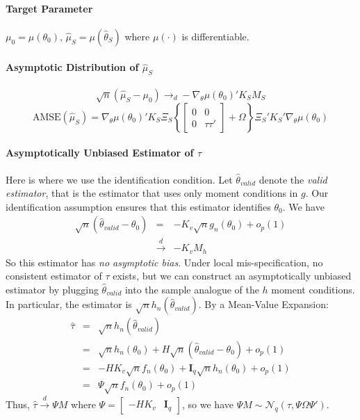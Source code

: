 \paragraph{Target Parameter} $\mu_0 = \mu(\theta_0)$, $\widehat{\mu}_S = \mu(\widehat{\theta}_S)$ where $\mu(\cdot)$ is differentiable.

\paragraph{Asymptotic Distribution of $\widehat{\mu}_S$} 
$$\sqrt{n}\left(\widehat{\mu}_S - \mu_0\right)\rightarrow_d-\nabla_\theta\mu(\theta_0)'K_S M_S$$
$$\mbox{AMSE}\left(\widehat{\mu}_S\right) = \nabla_\theta\mu(\theta_0)'K_S \Xi_S \left\{\left[\begin{array}{cc}0&0\\0&\tau\tau'\end{array}\right] + \Omega\right\}\Xi_S'K_S'\nabla_\theta\mu(\theta_0)$$

\paragraph{Asymptotically Unbiased Estimator of $\tau$} Here is where we use the identification condition. Let $\widehat{\theta}_{valid}$ denote the \emph{valid estimator}, that is the estimator that uses only moment conditions in $g$. Our identification assumption ensures that this estimator identifies $\theta_0$. We have
\begin{eqnarray*}
	\sqrt{n}\left(\widehat{\theta}_{valid} - \theta_0 \right) &=&  -K_v \sqrt{n}g_n(\theta_0) + o_p(1)\\
	&\overset{d}{\rightarrow}& -K_v M_h
\end{eqnarray*}
So this estimator has \emph{no asymptotic bias}. Under local mis-specification, no consistent estimator of $\tau$ exists, but we can construct an asymptotically unbiased estimator by plugging $\widehat{\theta}_{valid}$ into the sample analogue of the $h$ moment conditions. In particular, the estimator is $\sqrt{n} h_n\left(\widehat{\theta}_{valid}\right)$. By a Mean-Value Expansion:
\begin{eqnarray*}
	\widehat{\tau} &=& \sqrt{n} h_n\left(\widehat{\theta}_{valid}\right)\\
	& =& \sqrt{n}h_n(\theta_0) + H \sqrt{n}\left(\widehat{\theta}_{valid} - \theta_0\right) + o_p(1)\\
		&=&-HK_{v} \sqrt{n}f_n(\theta_0) + \mathbf{I}_q\sqrt{n}h_n(\theta_0) +o_p(1)\\
		&=& \Psi \sqrt{n}f_n(\theta_0) + o_p(1)
\end{eqnarray*}
Thus, $\widehat{\tau}\overset{d}{\rightarrow}\Psi M$ where $\Psi = \left[\begin{array}{cc} -HK_v & \mathbf{I}_q \end{array}\right]$, so we have $\Psi M \sim \mathcal{N}_q(\tau, \Psi \Omega \Psi')$.


